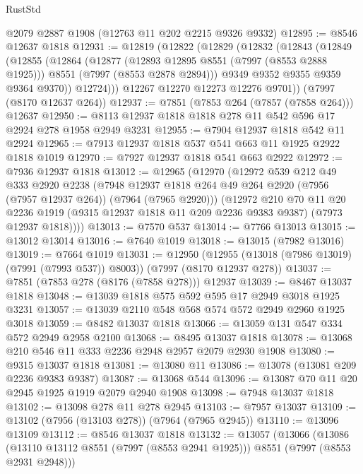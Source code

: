 \begin{lexlean}{RustStd}
\begin{coremodule}
{\begin{coremodule}
{{{{{{{{{{{{{{{{{{{{{{{{{{{{{{{{{{{{{{{{{{{    @2079
    @2887
    @1908
    (@12763 @11 @202 @2215 @9326 @9332)
@12895 := @8546 @12637 @1818
@12931 := @12819
    (@12822
      (@12829
        (@12832
          (@12843
            (@12849
              (@12855
                (@12864
                  (@12877
                    (@12893 @12895 @8551 (@7997 (@8553 @2888 @1925)))
                    @8551
                    (@7997 (@8553 @2878 @2894)))
                  @9349
                  @9352
                  @9355
                  @9359
                  @9364
                  @9370))
              @12724)))
        @12267
        @12270
        @12273
        @12276
        @9701))
    (@7997 (@8170 @12637 @264))
@12937 := @7851 (@7853 @264 (@7857 (@7858 @264))) @12637
@12950 := @8113 @12937 @1818 @1818 @278 @11 @542 @596 @17 @2924 @278 @1958 @2949 @3231
@12955 := @7904 @12937 @1818 @542 @11 @2924
@12965 := @7913 @12937 @1818 @537 @541 @663 @11 @1925 @2922 @1818 @1019
@12970 := @7927 @12937 @1818 @541 @663 @2922
@12972 := @7936 @12937 @1818
@13012 := @12965
    (@12970
      (@12972
        @539
        @212
        @49
        @333
        @2920
        @2238
        (@7948 @12937 @1818 @264 @49 @264 @2920 (@7956 (@7957 @12937 @264)) (@7964 (@7965 @2920)))
        (@12972
          @210
          @70
          @11
          @20
          @2236
          @1919
          (@9315 @12937 @1818 @11 @209 @2236 @9383 @9387)
          (@7973 @12937 @1818))))
@13013 := @7570 @537
@13014 := @7766 @13013
@13015 := @13012 @13014
@13016 := @7640 @1019
@13018 := @13015 (@7982 @13016)
@13019 := @7664 @1019
@13031 := @12950
    (@12955 (@13018 (@7986 @13019) (@7991 (@7993 @537)) @8003))
    (@7997 (@8170 @12937 @278))
@13037 := @7851 (@7853 @278 (@8176 (@7858 @278))) @12937
@13039 := @8467 @13037 @1818
@13048 := @13039 @1818 @575 @592 @595 @17 @2949 @3018 @1925 @3231
@13057 := @13039 @2110 @548 @568 @574 @572 @2949 @2960 @1925 @3018
@13059 := @8482 @13037 @1818
@13066 := @13059 @131 @547 @334 @572 @2949 @2958 @2100
@13068 := @8495 @13037 @1818
@13078 := @13068 @210 @546 @11 @333 @2236 @2948 @2957 @2079 @2930 @1908
@13080 := @9315 @13037 @1818
@13081 := @13080 @11
@13086 := @13078 (@13081 @209 @2236 @9383 @9387)
@13087 := @13068 @544
@13096 := @13087 @70 @11 @20 @2945 @1925 @1919 @2079 @2940 @1908
@13098 := @7948 @13037 @1818
@13102 := @13098 @278 @11 @278 @2945
@13103 := @7957 @13037
@13109 := @13102 (@7956 (@13103 @278)) (@7964 (@7965 @2945))
@13110 := @13096 @13109
@13112 := @8546 @13037 @1818
@13132 := @13057
    (@13066
      (@13086 (@13110 @13112 @8551 (@7997 (@8553 @2941 @1925))) @8551 (@7997 (@8553 @2931 @2948)))
}}}}}}}}}}}}}}}}}}}}}}}}}}}}}}}}}}}}}}}}}}}
\end{coremodule}}
\end{coremodule}
\end{lexlean}

